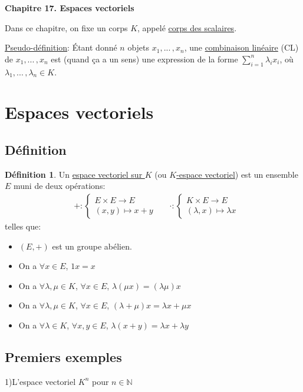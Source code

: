 \documentclass[10pt,a4paper]{article}
\theoremstyle{definition}
\newtheorem{definition}[proposition]{Définition}
\begin{document}
\renewcommand{\labelitemi}{$*$}
\renewcommand{\labelenumi}{(\roman{enumi})}
\begin{center}
{\Large \textbf{Chapitre 17. Espaces vectoriels}}
\end{center}
Dans ce chapitre, on fixe un corps $K$, appelé \uline{corps des scalaires}. \medskip

\uline{Pseudo-définition}: Étant donné $n$ objets $x_1, ...\, , x_n$, une \uline{combinaison linéaire} (CL) de $x_1, ...\, , x_n$ est (quand ça a un sens) une expression de la forme $\sum\limits_{i = 1}^n \lambda_i x_i$, où $\lambda_1, ...\, , \lambda_n \in K$.

\section{Espaces vectoriels}
\subsection{Définition}
\begin{definition}
Un \uline{espace vectoriel sur $K$} (ou \uline{$K$-espace vectoriel}) est un ensemble $E$ muni de deux opérations:
\begin{align*}
&+: \begin{cases}
E \times E \to E \\
(x, y) \mapsto x + y
\end{cases}
&
&\cdot: \begin{cases}
K \times E \to E \\
(\lambda, x) \mapsto \lambda x
\end{cases}
\end{align*}
telles que:
\begin{itemize}
\item $(E, +)$ est un groupe abélien.
\item On a $\forall x \in E$, $1 x = x$
\item On a $\forall \lambda, \mu \in K$, $\forall x \in E$, $\lambda(\mu x) = (\lambda \mu)x$
\item On a $\forall \lambda, \mu \in K$, $\forall x \in E$, $(\lambda + \mu) x = \lambda x + \mu x$
\item On a $\forall \lambda \in K$, $\forall x, y \in E$, $\lambda (x + y) = \lambda x + \lambda y$
\end{itemize}
\end{definition}

\subsection{Premiers exemples}
1)L'espace vectoriel $K^n$ pour $n \in \mathbb{N}$
\end{document}
